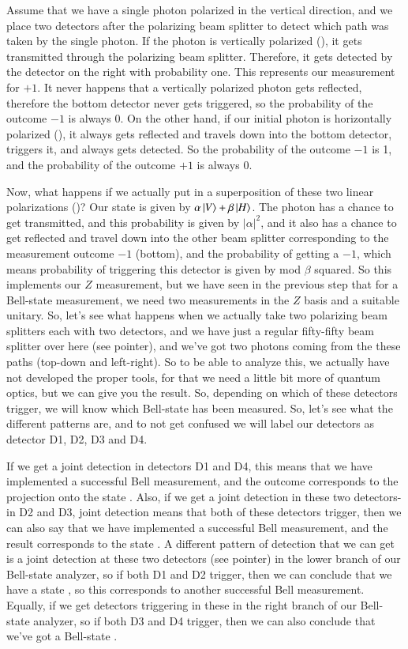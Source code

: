 Assume that we have a single photon polarized in the vertical direction, and we place two detectors after the polarizing beam splitter to detect which path was taken by the single photon. If the photon is vertically polarized (), it gets transmitted through the polarizing beam splitter. Therefore, it gets detected by the detector on the right with probability one. This represents our measurement for $+1$. It never happens that a vertically polarized photon gets reflected, therefore the bottom detector never gets triggered, so the probability of the outcome $-1$ is always 0. On the other hand, if our initial photon is horizontally polarized (), it always gets reflected and travels down into the bottom detector, triggers it, and always gets detected. So the probability of the outcome $-1$ is 1, and the probability of the outcome $+1$ is always 0.

Now, what happens if we actually put in a superposition of these two linear polarizations ()? Our state is given by $\alpha\left| V \right\rangle + \beta \left| H \right\rangle$. The photon has a chance to get transmitted, and this probability is given by $|\alpha|^2$, and it also has a chance to get reflected and travel down into the other beam splitter corresponding to the measurement outcome  $-1$ (bottom), and the probability of getting a  $-1$, which means probability of triggering this detector is given by mod $\beta$ squared. So this implements our $Z$ measurement, but we have seen in the previous step that for a Bell-state measurement, we need two measurements in the $Z$ basis and a suitable unitary. So, let's see what happens when we actually take two polarizing beam splitters each with two detectors, and we have just a regular fifty-fifty beam splitter over here (see pointer), and we've got two photons coming from the these paths (top-down and left-right). So to be able to analyze this, we actually have not developed the proper tools, for that we need a little bit more of quantum optics, but we can give you the result. So, depending on which of these detectors trigger, we will know which Bell-state has been measured. So, let's see what the different patterns are, and to not get confused we will label our detectors as detector D1, D2, D3 and D4.

If we get a joint detection in detectors D1 and D4, this means that we have implemented a successful Bell measurement, and the outcome corresponds to the projection onto the state \ket{\Psi^-}. Also, if we get a joint detection in these two detectors- in D2 and D3, joint detection means that both of these detectors trigger, then we can also say that we have implemented a successful Bell measurement, and the result corresponds to the state \ket{\Psi^-}. A different pattern of detection that we can get is a joint detection at these two detectors (see pointer) in the lower branch of our Bell-state analyzer, so if both D1 and D2 trigger, then we can conclude that we have a state \ket{\Psi^+}, so this corresponds to another successful Bell measurement. Equally, if we get detectors triggering in these in the right branch of our Bell-state analyzer, so if both D3 and D4 trigger, then we can also conclude that we've got a Bell-state \ket{\Psi^+}.

